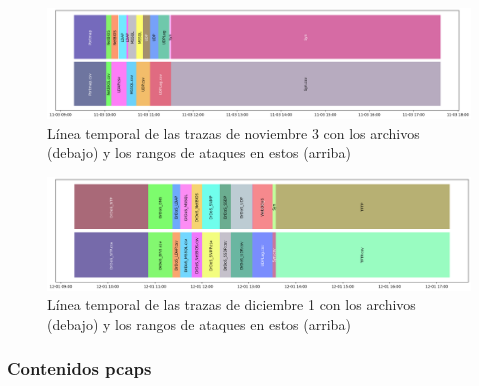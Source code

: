 \begin{figure}[!htb]
    \begin{center}
        \includegraphics[width=1\linewidth]{media/cicddos_2019_csv_03-11_timeline.png}
    \end{center}
    \captionsetup{justification=centering}
    \caption{Línea temporal de las trazas de noviembre 3 con los archivos (debajo) y los rangos de ataques en estos (arriba)}\label{fig:cicddos_2019_csv_03-11_timeline}
\end{figure}
\begin{figure}[!htb]
    \begin{center}
        \includegraphics[width=1\linewidth]{media/cicddos_2019_csv_01-12_timeline.png}
    \end{center}
    \captionsetup{justification=centering}
    \caption{Línea temporal de las trazas de diciembre 1 con los archivos (debajo) y los rangos de ataques en estos (arriba)}\label{fig:cicddos_2019_csv_01-12_timeline}
\end{figure}


\subsubsection{Contenidos pcaps}

